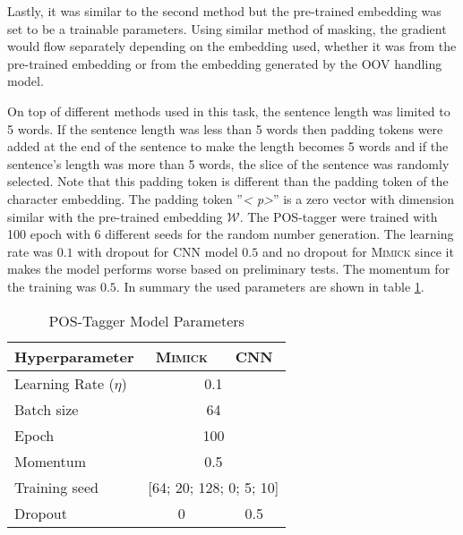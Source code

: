         Lastly, it was similar to the second method but the pre-trained
        embedding was set to be a trainable parameters. Using similar
        method of masking, the gradient would flow separately depending
        on the embedding used, whether it was from the pre-trained
        embedding or from the embedding generated by the OOV handling model.

        On top of different methods used in this task, the sentence
        length was limited to 5 words. If the sentence length was less
        than 5 words then padding tokens were added at the end of the
        sentence to make the length becomes 5 words and if the
        sentence's length was more than 5 words, the slice of the
        sentence was randomly selected. Note that this padding token
        is different than the padding token of the character
        embedding. The padding token ''\textit{\textless
        p\textgreater}'' is a zero vector with dimension similar with
        the pre-trained embedding $\mathcal{W}$. The POS-tagger were
        trained with 100 epoch with 6 different seeds for the random
        number generation. The learning rate was $0.1$ with dropout
        for CNN model $0.5$ and no dropout for \textsc{Mimick} since
        it makes the model performs worse based on preliminary tests.
        The momentum for the training was $0.5$. In summary the used
        parameters are shown in table \ref{tab:hyperparameterpostag}.

        \begin{table}[]
            \centering
            \caption{POS-Tagger Model Parameters}
            \label{tab:hyperparameterpostag}
            \begin{tabular}{@{}lcc@{}}
                \toprule
                \textbf{Hyperparameter} & \multicolumn{1}{c}{\textbf{\textsc{Mimick}}} & \multicolumn{1}{c}{\textbf{CNN}} \\ \midrule
                Learning Rate ($\eta$) & \multicolumn{2}{c}{0.1} \\
                Batch size & \multicolumn{2}{c}{64} \\
                Epoch & \multicolumn{2}{c}{100} \\
                Momentum & \multicolumn{2}{c}{0.5} \\
                Training seed & \multicolumn{2}{c}{[64; 20; 128; 0; 5;
                10]} \\
                Dropout & 0 & 0.5 \\ 
                \bottomrule
            \end{tabular}
        \end{table}

